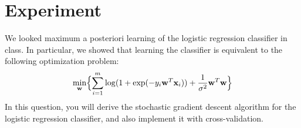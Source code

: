 \section{Experiment}
\label{sec:experiment}

We looked maximum a posteriori learning of the logistic regression classifier in class. In particular, we showed that learning the classifier is equivalent to the following optimization problem:
\[
\min_{{\bf w}} \Bigl\{\sum_{i=1}^m \log(1+ \exp(-y_i{\bf w}^T{\bf x}_i)) + \frac{1}{\sigma^2}{\bf w}^T{\bf w}\Bigr\}
\]
In this question, you will derive the stochastic gradient descent algorithm for the logistic
regression classifier, and also implement it with cross-validation. 

